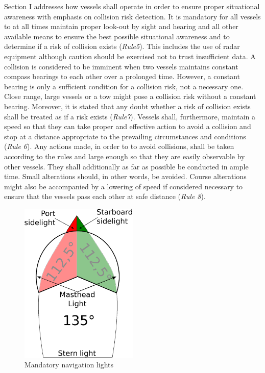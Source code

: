 Section I addresses how vessels shall operate in order to ensure proper situational awareness with emphasis on collision risk detection.
It is mandatory for  all vessels to at all times maintain proper look-out by sight and hearing and all other available means to ensure the best possible situational awareness and  to determine if a risk of collision exists (\textit{Rule5}).
This includes the use of radar equipment although caution should be exercised not to trust insufficient data. A collision is considered to be imminent when two vessels maintains constant compass bearings to each other over a prolonged time.
However, a constant bearing is only a sufficient condition for a collision risk, not a necessary one. Close range, large vessels or a tow might pose a collision risk without a constant bearing. Moreover, it is stated that any doubt whether a risk of collision exists shall be treated as if a risk exists (\textit{Rule7}).
Vessels shall, furthermore, maintain a speed so that they can take proper and effective action to avoid a collision and stop at a distance appropriate to the prevailing circumstances and conditions (\textit{Rule 6}). Any actions made, in order to to avoid collisions, shall be taken according to the rules and large enough so that they are easily observable by other vessels. They shall additionally as far as possible be conducted in ample time. Small alterations should, in other words, be avoided. Course alterations might also be accompanied by a lowering of speed if considered necessary to ensure that the vessels pass each other at safe distance (\textit{Rule 8}).
\begin{figure}
    \centering
    \includegraphics[width=0.5\textwidth,height=0.5\textheight,keepaspectratio]{Figures/lights.eps}
    \caption{Mandatory navigation lights}
    \label{fig:nav_lights}
\end{figure}

